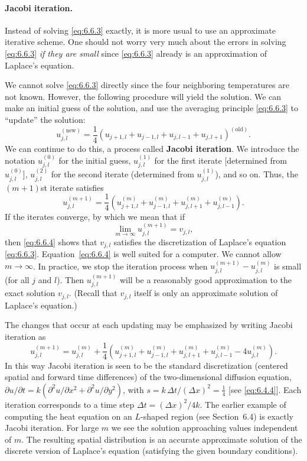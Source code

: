 \paragraph{Jacobi iteration.}
Instead of solving \eqref{eq:6.6.3} exactly, it is more usual to use an approximate iterative scheme.  One should not worry very much about the errors in solving \eqref{eq:6.6.3} \emph{if they are small} since \eqref{eq:6.6.3} already is an approximation of Laplace's equation.

We cannot solve \eqref{eq:6.6.3} directly since the four neighboring temperatures are not known.  However, the following procedure will yield the solution.  We can make an initial guess of the solution, and use the averaging principle \eqref{eq:6.6.3} to ``update'' the solution:
\[
u_{j,l}^{(\text{new})} = \frac{1}{4}\left(u_{j+1,l} + u_{j-1,l} + u_{j,l-1} + u_{j,l+1}\right)^{(\text{old})}.
\]
We can continue to do this, a process called \textbf{Jacobi iteration}.  We introduce the notation $u_{j,l}^{(0)}$ for the initial guess, $u_{j,l}^{(1)}$ for the first iterate [determined from $u_{j,l}^{(0)}$], $u_{j,l}^{(2)}$ for the second iterate (determined from $u_{j,l}^{(1)}$), and so on.  Thus, the $(m+1)$st iterate satisfies
\begin{equation}
\boxed{u_{j,l}^{(m+1)} = \frac{1}{4}\left(u_{j+1,l}^{(m)} + u_{j-1,l}^{(m)} + u_{j,l+1}^{(m)} + u_{j,l-1}^{(m)}\right).}
\label{eq:6.6.4}
\end{equation}
If the iterates converge, by which we mean that if
\[
\lim_{m\to\infty} u_{j,l}^{(m+1)} = v_{j,l},
\]
then \eqref{eq:6.6.4} shows that $v_{j,l}$ satisfies the discretization of Laplace's equation \eqref{eq:6.6.3}.  Equation~\eqref{eq:6.6.4} is well suited for a computer.  We cannot allow $m \to \infty$.  In practice, we stop the iteration process when $u_{j,l}^{(m+1)} - u_{j,l}^{(m)}$ is small (for all $j$ and $l$).  Then $u_{j,l}^{(m+1)}$ will be a reasonably good approximation to the exact solution $v_{j,l}$.  (Recall that $v_{j,l}$ itself is only an approximate solution of Laplace's equation.)

The changes that occur at each updating may be emphasized by writing Jacobi iteration as
\begin{equation}
u_{j,l}^{(m+1)} = u_{j,l}^{(m)} + \frac{1}{4}\left(u_{j+1,l}^{(m)} + u_{j-1,l}^{(m)} + u_{j,l+1}^{(m)} + u_{j,l-1}^{(m)} - 4u_{j,l}^{(m)}\right).
\label{eq:6.6.5}
\end{equation}
In this way Jacobi iteration is seen to be the standard discretization (centered spatial and forward time differences) of the two-dimensional diffusion equation, $\partial u/\partial t = k(\partial^2 u/\partial x^2 + \partial^2 u/\partial y^2)$, with $s = k\,\Delta t/(\Delta x)^2 = \frac{1}{4}$ [see \eqref{eq:6.4.4}].  Each iteration corresponds to a time step $\Delta t = (\Delta x)^2/4k$.  The earlier example of computing the heat equation on an $L$-shaped region (see Section~6.4) is exactly Jacobi iteration.  For large $m$ we see the solution approaching values independent of $m$.  The resulting spatial distribution is an accurate approximate solution of the discrete version of Laplace's equation (satisfying the given boundary conditions).

